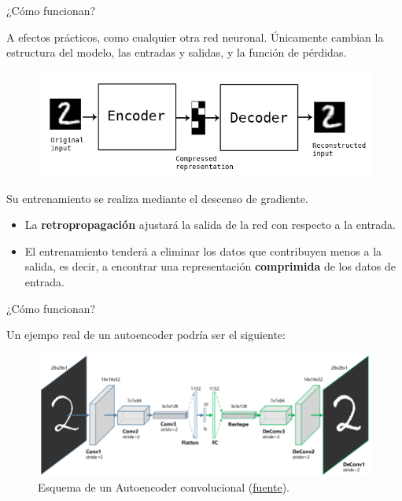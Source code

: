 \begin{frame}{¿Cómo funcionan?}

A efectos prácticos, como cualquier otra red neuronal. Únicamente cambian la estructura del modelo, las entradas y salidas, y la función de pérdidas.

\begin{figure}
    \centering
    \includegraphics[width=.7\textwidth]{Slides/figures/02_Metodos_Generativos/cnn-ae.jpg}
\end{figure}

Su entrenamiento se realiza mediante el descenso de gradiente.

\begin{itemize}
    \item La \textbf{retropropagación} ajustará la salida de la red con respecto a la entrada.
    \item El entrenamiento tenderá a eliminar los datos que contribuyen menos a la salida, es decir, a encontrar una representación \textbf{comprimida} de los datos de entrada.
\end{itemize}
\end{frame}


\begin{frame}{¿Cómo funcionan?}

Un ejempo real de un autoencoder podría ser el siguiente:

\begin{figure}
    \centering
    \includegraphics[width=\textwidth]{Slides/figures/02_Metodos_Generativos/2.2. ae conv.png}
    \caption{Esquema de un Autoencoder convolucional (\href{https://www.researchgate.net/profile/Xifeng-Guo/publication/320658590/figure/fig1/AS:614154637418504@1523437284408/The-structure-of-proposed-Convolutional-AutoEncoders-CAE-for-MNIST-In-the-middle-there.png}{fuente}).}
\end{figure}

\end{frame}


